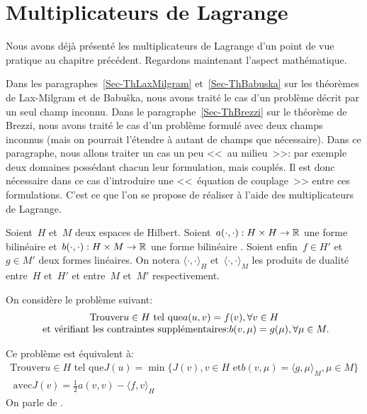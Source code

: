 \medskip



\section{Multiplicateurs de Lagrange}\label{Sec-MultLag}
Nous avons déjà présenté les multiplicateurs de Lagrange d'un point de
vue pratique au chapitre précédent.
Regardons maintenant l'aspect mathématique.

Dans les paragraphes~\ref{Sec-ThLaxMilgram} et~\ref{Sec-ThBabuska} sur les théorèmes de Lax-Milgram et
de Babuška, nous avons traité le cas d'un problème décrit par un seul champ inconnu.
Dans le paragraphe~\ref{Sec-ThBrezzi} sur le théorème de Brezzi, nous avons traité le cas d'un problème formulé
avec deux champs inconnus (mais on pourrait l'étendre à autant de champs
que nécessaire).
Dans ce paragraphe, nous allons traiter un cas un peu <<~au milieu~>>: par exemple
deux domaines possédant chacun leur formulation, mais couplés. Il est donc
nécessaire dans ce cas d'introduire une <<~équation de couplage~>> entre ces
formulations. C'est ce que l'on se propose de réaliser à l'aide des multiplicateurs
de Lagrange.

\medskip
\begin{definition}
Soient~$H$ et~$M$ deux espaces de Hilbert.
Soient~$a(\cdot,\cdot): H\times H\rightarrow\mathbb R$ une forme bilinéaire 
et~$b(\cdot,\cdot): H\times M\rightarrow\mathbb R$ une forme bilinéaire .
Soient enfin~$f\in H'$ et~$g\in M'$ deux formes linéaires. On notera
$\langle\cdot,\cdot\rangle_H$ et~$\langle\cdot,\cdot\rangle_M$ les produits de dualité entre~$H$ et~$H'$
et entre~$M$ et~$M'$ respectivement.

\medskip
On considère le problème suivant:
\begin{equation}
\begin{array}{c}
\text{Trouver} u\in H \text{ tel que} a(u,v)=f(v), \forall v\in H \\
\text{ et vérifiant les
contraintes supplémentaires:} b(v,\mu)=g(\mu), \forall \mu\in M.
\end{array}
\end{equation}

\medskip
Ce problème est équivalent à:
\begin{equation}\label{Eq-Pmin}
\begin{array}{c}
\text{Trouver} u\in H \text{ tel que}
J(u)=\min\{J(v), v\in H \text{ et} b(v,\mu)=\langle g,\mu\rangle_M, \mu\in M\} \\[+3mm]
\text{ avec}
J(v)=\frac12 a(v,v)-\langle f,v\rangle_H
\end{array}
\end{equation}
On parle de .
\end{definition}

